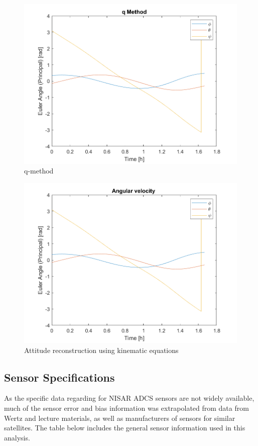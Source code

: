 \begin{figure}[H]
\centering
\includegraphics[scale=0.8]{Images/ps6_problem6_qMethod.png}
\caption{q-method}
\label{fig:Images/ps6_problem6_qMethod}
\end{figure}

\begin{figure}[H]
\centering
\includegraphics[scale=0.8]{Images/ps6_problem6_kins.png}
\caption{Attitude reconstruction using kinematic equations}
\label{fig:Images/ps6_problem6_kins}
\end{figure}

\subsection{Sensor Specifications}
As the specific data regarding for NISAR ADCS sensors are not widely available, much of the sensor error and bias information was extrapolated from data from Wertz and lecture materials, as well as manufacturers of sensors for similar satellites. The table below includes the general sensor information used in this analysis.


